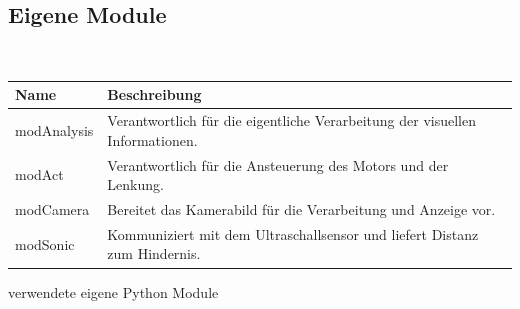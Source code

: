   \subsection{Eigene Module}
  \ \\
  \begin{minipage}{\columnwidth}
    \makeatletter
    \def\@captype{table}
    \makeatother
    \centering
    \begin{tabular}{p{3.5cm}|p{11cm}}
    Name & Beschreibung \\ \hline \hline
    modAnalysis & Verantwortlich für die eigentliche Verarbeitung der visuellen
      Informationen. \\
    modAct & Verantwortlich für die Ansteuerung des Motors und der Lenkung. \\
    modCamera & Bereitet das Kamerabild für die Verarbeitung und Anzeige vor. \\
    modSonic & Kommuniziert mit dem Ultraschallsensor und liefert Distanz zum Hindernis.\\
    \end{tabular}
    \caption{verwendete eigene Python Module}
    \label{tab:01}
  \end{minipage}

